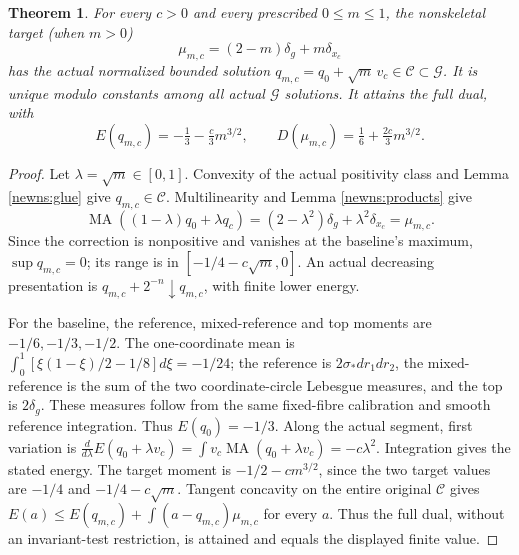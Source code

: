 \documentclass[11pt]{article}
\newtheorem{theorem}{Theorem}
\newcommand{\MA}{\operatorname{MA}}
\newcommand{\C}{\mathcal C}
\begin{document}
\begin{theorem}\label{newns:equation}
For every $c>0$ and every prescribed $0\le m\le1$, the nonskeletal
target (when $m>0$)
\[
 \mu_{m,c}=(2-m)\delta_g+m\delta_{x_c}
\]
has the actual normalized bounded solution
$q_{m,c}=q_0+\sqrt m\,v_c\in\C\subset\mathcal G$.
It is unique modulo constants among all actual $\mathcal G$ solutions.
It attains the full dual, with
\[
 E(q_{m,c})=-\tfrac13-\tfrac c3m^{3/2},\qquad
 D(\mu_{m,c})=\tfrac16+\tfrac{2c}{3}m^{3/2}.
\]
\end{theorem}
\begin{proof}
Let $\lambda=\sqrt m\in[0,1]$. Convexity of the actual positivity
class and Lemma \ref{newns:glue} give $q_{m,c}\in\C$.
Multilinearity and Lemma \ref{newns:products} give
\[
 \MA((1-\lambda)q_0+\lambda q_c)
 =(2-\lambda^2)\delta_g+\lambda^2\delta_{x_c}=\mu_{m,c}.
\]
Since the correction is nonpositive and vanishes at the baseline's
maximum, $\sup q_{m,c}=0$; its range is in $[-1/4-c\sqrt m,0]$.
An actual decreasing presentation is $q_{m,c}+2^{-n}\downarrow q_{m,c}$,
with finite lower energy.

For the baseline, the reference, mixed-reference and top moments are
$-1/6,-1/3,-1/2$. The one-coordinate mean is
$\int_0^1[\xi(1-\xi)/2-1/8]d\xi=-1/24$;
the reference is $2\sigma_*dr_1dr_2$, the mixed-reference is the sum
of the two coordinate-circle Lebesgue measures, and the top is $2\delta_g$.
These measures follow from the same fixed-fibre calibration and smooth
reference integration. Thus $E(q_0)=-1/3$.
Along the actual segment, first variation is
$\frac d{d\lambda}E(q_0+\lambda v_c)=\int v_c\MA(q_0+\lambda v_c)
=-c\lambda^2$. Integration gives the stated energy.
The target moment is $-1/2-cm^{3/2}$, since the two target values are
$-1/4$ and $-1/4-c\sqrt m$.
Tangent concavity on the entire original $\C$ gives
$E(a)\le E(q_{m,c})+\int(a-q_{m,c})\mu_{m,c}$ for every $a$.
Thus the full dual, without an invariant-test restriction, is attained
and equals the displayed finite value.


\end{proof}
\end{document}
